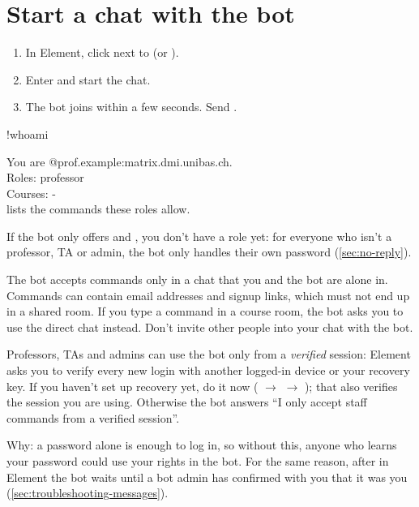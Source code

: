 \section{Start a chat with the bot}

\begin{enumerate}
  \item In Element, click \ui{+} next to  (or ).
  \item Enter \botid{} and start the chat.
  \item The bot joins within a few seconds. Send .
\end{enumerate}

\begin{you}
!whoami
\end{you}
\begin{botreply}
You are @prof.example:matrix.dmi.unibas.ch.\\
Roles: professor\\
Courses: -\\[4pt]
 lists the commands these roles allow.
\end{botreply}

If the bot only offers  and , you don't have a role yet:
for everyone who isn't a professor, TA or admin, the bot only handles their own password
(\autoref{sec:no-reply}).

\begin{note}
The bot accepts commands only in a chat that you and the bot are alone in. Commands can
contain email addresses and signup links, which must not end up in a shared room. If you
type a command in a course room, the bot asks you to use the direct chat instead. Don't
invite other people into your chat with the bot.
\end{note}

\begin{note}
Professors, TAs and admins can use the bot only from a \emph{verified} session: Element asks
you to verify every new login with another logged-in device or your recovery key. If you
haven't set up recovery yet, do it now ( $\rightarrow$ 
$\rightarrow$ ); that also verifies the session you are using. Otherwise
the bot answers \enquote{I only accept staff commands from a verified session}.
\smallskip

Why: a password alone is enough to log in, so without this, anyone who learns your password
could use your rights in the bot. For the same reason, after  in Element
the bot waits until a bot admin has confirmed with you that it was you
(\autoref{sec:troubleshooting-messages}).
\end{note}

